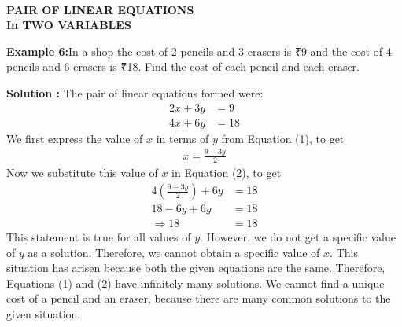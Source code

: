 \documentclass[a4paper,10pt]{article}
\begin{document}
\pagestyle{empty} %

\thispagestyle{fancy} %
\fancyhf{} %
\renewcommand{\headrulewidth}{0pt} %

    \vspace{1cm}
\begin{center}

    {\LARGE \textbf{\textcolor{cyanblue}{\\ PAIR OF LINEAR EQUATIONS\\ In TWO VARIABLES}}}
\end{center}
  \vspace{1cm}   
\textbf{\textcolor{cyanblue}{Example 6:}}In a shop the cost of 2 pencils and 3 erasers is ₹9 and the cost of 4 pencils and 6 erasers is ₹18. Find the cost of each pencil and each eraser.

\textbf{\textcolor{cyanblue}{Solution :}} The pair of linear equations formed were:
\begin{align}
2x + 3y &= 9 \tag{1}\\
4x + 6y &= 18 \tag{2}
\end{align}
We first express the value of \( x \) in terms of \( y \) from Equation (1), to get
\begin{align}
x = \frac{9 - 3y}{2} \tag{3}
\end{align}
Now we substitute this value of \( x \) in Equation (2), to get
\begin{align*}
4 \left( \frac{9 - 3y}{2} \right) + 6y &= 18 \\
18 - 6y + 6y &= 18 \\
\Rightarrow 18 &= 18
\end{align*}
This statement is true for all values of \( y \). However, we do not get a specific value of \( y \) as a solution. Therefore, we cannot obtain a specific value of \( x \). This situation has arisen because both the given equations are the same. 
Therefore, Equations (1) and (2) have infinitely many solutions. We cannot find a unique cost of a pencil and an eraser, because there are many common solutions to the given situation.
\end{document}
